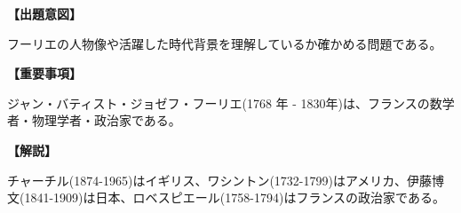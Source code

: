 \noindent \textbf{【出題意図】}

\noindent フーリエの人物像や活躍した時代背景を理解しているか確かめる問題である。

\vspace{1em}
\noindent \textbf{【重要事項】}

ジャン・バティスト・ジョゼフ・フーリエ(1768 年 - 1830年)は、フランスの数学者・物理学者・政治家である。

\vspace{1em}
\noindent \textbf{【解説】}

\noindent チャーチル(1874-1965)はイギリス、ワシントン(1732-1799)はアメリカ、伊藤博文(1841-1909)は日本、ロベスピエール(1758-1794)はフランスの政治家である。

